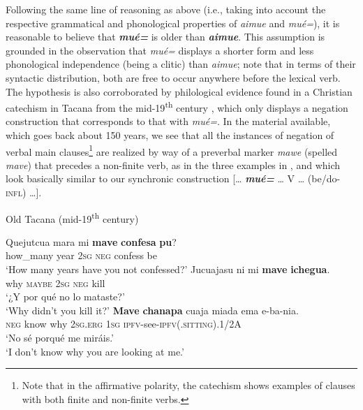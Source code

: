 \documentclass[output=paper,draft,draftmode,colorlinks,citecolor=brown]{langscibook}
\begin{document}
Following the same line of reasoning as above (i.e., taking into account
the respective grammatical and phonological properties of \textit{aimue}
and \textit{mué=}), it is reasonable to believe that \textbf{\textit{mué=}}
is older than \textbf{\textit{aimue}}. This assumption is grounded in the
observation that \textit{mué=} displays a shorter form and less
phonological independence (being a clitic) than \textit{aimue}; note that
in terms of their syntactic distribution, both are free to occur anywhere
before the lexical verb. The hypothesis is also corroborated by
philological evidence found in a Christian catechism in Tacana from
the mid-19\textsuperscript{th} century \cite{LafoneQuevedo1902}, which only displays a negation construction that
corresponds to that with \textit{mué=}. In the material available, which
goes back about 150 years, we see that all the instances of negation
of verbal main clauses\footnote{\label{fn:tacana-catechism} Note that in the affirmative polarity, the catechism shows
    examples of clauses with both finite and non-finite verbs.} 
%
are realized by way of a preverbal marker \textit{mawe} (spelled
\textit{mave}) that precedes a non-finite verb, as in the three examples in
, and which look basically similar to our synchronic construction […  \textbf{\textit{mué=}}  …  V  …  (be/do-\textsc{infl}) …].

\newpage
\begin{exe}\ex\label{ex:tacana-old-catecism} Old Tacana
(mid-19\textsuperscript{th} century)
\begin{xlist}
\ex
\gll Quejutcua mara mi \textbf{mave}
\textbf{confesa} \textbf{pu}?\\
    how\_many year \textsc{2sg} \textsc{neg} confess be\\
\glt `How many years have you not confessed?' \parencite[297]{LafoneQuevedo1902}
\ex
\gll Jucuajasu ni mi \textbf{mave}
\textbf{ichegua}.\\
    why  \textsc{maybe}  \textsc{2sg}  \textsc{neg}  kill\\
\glt `¿Y por qué no lo mataste?' \parencite[310]{LafoneQuevedo1902}\\
`Why didn't you kill it?'
\ex
\gll {}\textbf{Mave} \textbf{chanapa} cuaja
 miada ema e-ba-nia.\\
    \textsc{neg}  know  why  \textsc{2sg.erg}  \textsc{1sg}
    \textsc{ipfv}-see-\textsc{ipfv(.sitting)}.1/2A\\
\glt `No sé porqué me miráis.' \parencite[310]{LafoneQuevedo1902}\\
`I don't know why you are looking at me.'
\end{xlist}\end{exe}
\end{document}
